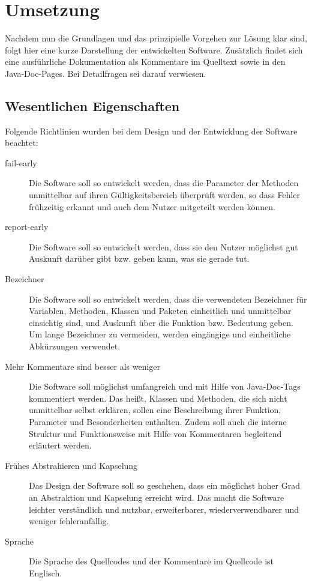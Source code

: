 \section{Umsetzung}
\label{sec:software}
Nachdem nun die Grundlagen und das prinzipielle Vorgehen zur Lösung klar sind, folgt hier eine kurze Darstellung der entwickelten Software. Zusätzlich findet sich eine ausführliche Dokumentation als Kommentare im Quelltext sowie in den Java-Doc-Pages. Bei Detailfragen sei darauf verwiesen. \par

\subsection{Wesentlichen Eigenschaften}
Folgende Richtlinien wurden bei dem Design und der Entwicklung der Software beachtet:

\begin{description}
\item[fail-early]
Die Software soll so entwickelt werden, dass die Parameter der Methoden unmittelbar auf ihren Gültigkeitsbereich überprüft werden, so dass Fehler frühzeitig erkannt und auch dem Nutzer mitgeteilt werden können. 

\item[report-early]
Die Software soll so entwickelt werden, dass sie den Nutzer möglichst gut Auskunft darüber gibt bzw. geben kann, was sie gerade tut. 

\item[Bezeichner]
Die Software soll so entwickelt werden, dass die verwendeten Bezeichner für Variablen, Methoden, Klassen und Paketen einheitlich und unmittelbar einsichtig sind, und Auskunft über die Funktion bzw. Bedeutung geben. Um lange Bezeichner zu vermeiden, werden eingängige und einheitliche Abkürzungen verwendet.\par

\item[Mehr Kommentare sind besser als weniger]
Die Software soll möglichst umfangreich und mit Hilfe von Java-Doc-Tags kommentiert werden. Das heißt, Klassen und Methoden, die sich nicht unmittelbar selbst erklären, sollen eine Beschreibung ihrer Funktion, Parameter und Besonderheiten enthalten. Zudem soll auch die interne Struktur und Funktionsweise mit Hilfe von Kommentaren begleitend erläutert werden.

\item[Frühes Abstrahieren und Kapselung]
Das Design der Software soll so geschehen, dass ein möglichst hoher Grad an Abstraktion und Kapselung erreicht wird. Das macht die Software leichter verständlich und nutzbar, erweiterbarer, wiederverwendbarer und weniger fehleranfällig.

\item[Sprache]
Die Sprache des Quellcodes und der Kommentare im Quellcode ist Englisch.
\end{description}

